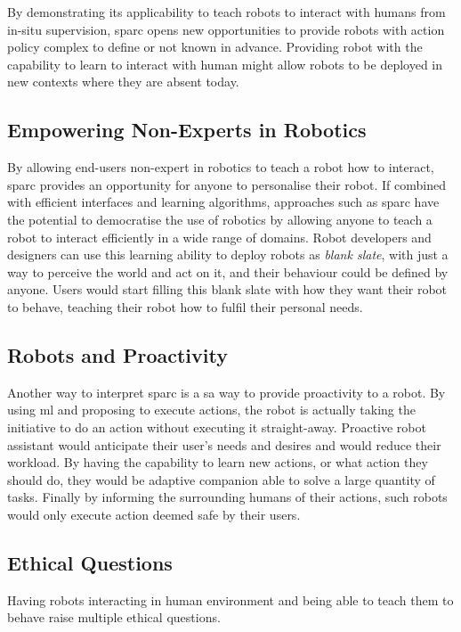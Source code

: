 By demonstrating its applicability to teach robots to interact with humans from in-situ supervision, \gls{sparc} opens new opportunities to provide robots with action policy complex to define or not known in advance. Providing robot with the capability to learn to interact with human might allow robots to be deployed in new contexts where they are absent today.

\subsection{Empowering Non-Experts in Robotics}

By allowing end-users non-expert in robotics to teach a robot how to interact, \gls{sparc} provides an opportunity for anyone to personalise their robot. If combined with efficient interfaces and learning algorithms, approaches such as \gls{sparc} have the potential to democratise the use of robotics by allowing anyone to teach a robot to interact efficiently in a wide range of domains. Robot developers and designers can use this learning ability to deploy robots as \emph{blank slate}, with just a way to perceive the world and act on it, and their behaviour could be defined by anyone. Users would start filling this blank slate with how they want their robot to behave, teaching their robot how to fulfil their personal needs.

\subsection{Robots and Proactivity}

Another way to interpret \gls{sparc} is a sa way to provide proactivity to a robot. By using \gls{ml} and proposing to execute actions, the robot is actually taking the initiative to do an action without executing it straight-away. Proactive robot assistant would anticipate their user's needs and desires and would reduce their workload. By having the capability to learn new actions, or what action they should do, they would be adaptive companion able to solve a large quantity of tasks. Finally by informing the surrounding humans of their actions, such robots would only execute action deemed safe by their users.

\subsection{Ethical Questions} \label{sec:disc_ethics}

Having robots interacting in human environment and being able to teach them to behave raise multiple ethical questions.


